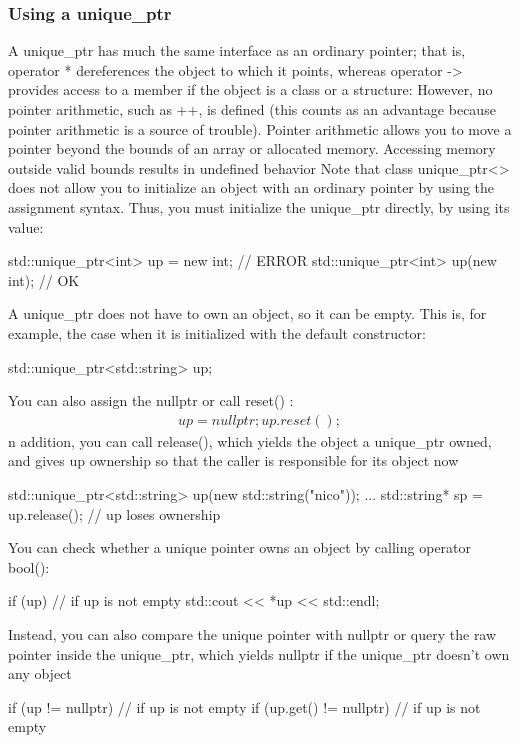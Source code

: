\documentclass{report}
\begin{document}
\subsubsection{Using a unique\_ptr}
\bigbreak \noindent 
A unique\_ptr has much the same interface as an ordinary pointer; that is, operator * dereferences the object to which it points, whereas operator -> provides access to a member if the object is a class or a structure:
\bigbreak \noindent 
However, no pointer arithmetic, such as ++, is defined (this counts as an advantage because pointer arithmetic is a source of trouble). Pointer arithmetic allows you to move a pointer beyond the bounds of an array or allocated memory. Accessing memory outside valid bounds results in undefined behavior
\bigbreak \noindent 
Note that class unique\_ptr<> does not allow you to initialize an object with an ordinary pointer
by using the assignment syntax. Thus, you must initialize the unique\_ptr directly, by using its
value:
\bigbreak \noindent 
\begin{cppcode}
std::unique_ptr<int> up = new int; // ERROR
std::unique_ptr<int> up(new int); // OK
\end{cppcode}
\bigbreak \noindent 
A unique\_ptr does not have to own an object, so it can be empty. This is, for example, the case when it is initialized with the default constructor:
\bigbreak \noindent 
\begin{cppcode}
std::unique_ptr<std::string> up;
\end{cppcode}
\bigbreak \noindent 
You can also assign the nullptr or call reset() :
\begin{align*}
    up = nullptr;
    up.reset();
\end{align*}
\bigbreak \noindent 
n addition, you can call release(), which yields the object a unique\_ptr owned, and gives up ownership so that the caller is responsible for its object now
\bigbreak \noindent 
\begin{cppcode}
    std::unique_ptr<std::string> up(new std::string("nico"));
    ...
    std::string* sp = up.release(); // up loses ownership
\end{cppcode}
\bigbreak \noindent 
You can check whether a unique pointer owns an object by calling operator bool():
\bigbreak \noindent 
\begin{cppcode}
    if (up) { // if up is not empty
        std::cout << *up << std::endl;
    }
\end{cppcode}
\bigbreak \noindent 
Instead, you can also compare the unique pointer with nullptr or query the raw pointer inside the unique\_ptr, which yields nullptr if the unique\_ptr doesn’t own any object
\begin{cppcode}
    if (up != nullptr) // if up is not empty
    if (up.get() != nullptr) // if up is not empty
\end{cppcode}
\bigbreak \noindent 
\end{document}
